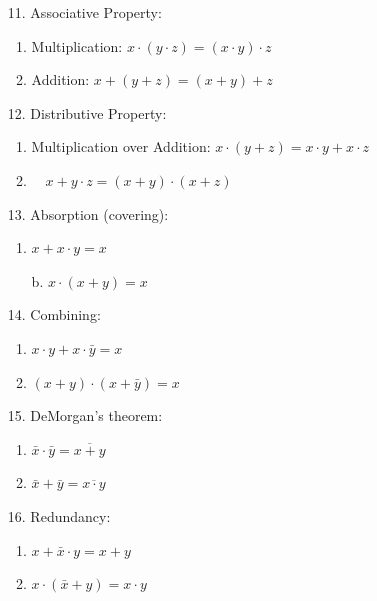 \documentclass[12pt,openany]{book}
\begin{document}
\begin{multicols}{2}
\begin{enumerate}
			      			\item[11.] Associative Property:
			      			      \begin{enumerate}
			      			      	\item Multiplication: \( x \cdot (y \cdot z) = (x \cdot y) \cdot z \)
			      			      	\item Addition: \( x + (y + z) = (x + y) + z \)
			      			      \end{enumerate}
			      			\item[12.] Distributive Property:
			      			      \begin{enumerate}
			      			      	\item Multiplication over Addition: \( x \cdot (y + z) = x \cdot y + x \cdot z \)
			      			      	\item $\quad x + y \cdot z = (x + y) \cdot (x + z)$
			      			      \end{enumerate}
			      			\item[13.] Absorption (covering):
			      			      \begin{enumerate}
			      			      	\item $x + x \cdot y = x$
			      			      	\item[b.] $x \cdot (x + y) = x$
			      			      \end{enumerate}
			      			\item[14.] Combining:
			      			      \begin{enumerate}
			      			      	\item $x \cdot y + x \cdot \bar{y} = x$
			      			      	\item $(x + y) \cdot (x + \bar{y}) = x$ 
			      			      \end{enumerate}
			      			      \vspace*{20px}
			      			\item[15.] DeMorgan's theorem:
			      			      \begin{enumerate}
			      			      	\item $\bar{x} \cdot \bar{y} = \overline{x + y}$
			      			      	\item $\bar{x} + \bar{y} = \overline{x \cdot y}$
			      			      \end{enumerate}
			      			\item[16.] Redundancy:
			      			      \begin{enumerate}
			      			      	\item $x + \bar{x} \cdot y = x + y$
			      			      	\item $x \cdot (\bar{x} + y) = x \cdot y$

\end{enumerate}
\end{enumerate}
\end{multicols}
\end{document}
